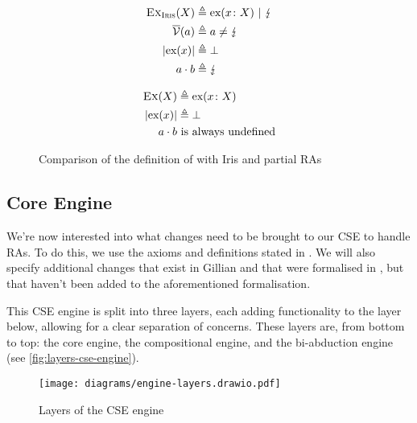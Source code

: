 \begin{figure}
\noindent\begin{minipage}{.5\linewidth}
\begin{align*}
	\textsc{Ex}_{\textsc{Iris}}(X) &\triangleq \text{ex}(x\colon X) ~|~ \lightning \\
	\overline{\cal V}(a) &\triangleq a \neq \lightning \\
	|\text{ex}(x)| &\triangleq \bot\\
	a \cdot b &\triangleq \lightning
\end{align*}\end{minipage}%
\begin{minipage}{.5\linewidth}
\begin{align*}
	\textsc{Ex}(X) &\triangleq \text{ex}(x\colon X) \\
	|\text{ex}(x)| &\triangleq \bot\\
	a \cdot b & \text{ is always undefined}
\end{align*}\end{minipage}
\caption{Comparison of the definition of \Ex{} with Iris and partial RAs}
\label{fig:comp-def-ex}
\end{figure}


\subsection{Core Engine}

We're now interested into what changes need to be brought to our CSE to handle RAs. To do this, we use the axioms and definitions stated in \cite{cse2}. We will also specify additional changes that exist in Gillian and that were formalised in \cite{sacha-phd}, but that haven't been added to the aforementioned formalisation.

This CSE engine is split into three layers, each adding functionality to the layer below, allowing for a clear separation of concerns. These layers are, from bottom to top: the core engine, the compositional engine, and the bi-abduction engine (see \autoref{fig:layers-cse-engine}).

\begin{figure}
	\centering
	\texttt{[image: diagrams/engine-layers.drawio.pdf]}
	\caption{Layers of the CSE engine}
	\label{fig:layers-cse-engine}
\end{figure}

